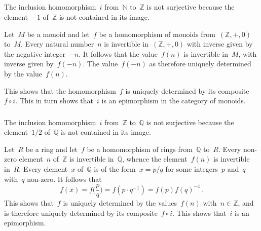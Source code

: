 \subsection{}



\subsubsection{}

The inclusion homomorphism~$i$ from~$ℕ$ to~$ℤ$ is not surjective because the element~$-1$ of~$ℤ$ is not contained in its image.

Let~$M$ be a monoid and let~$f$ be a homomorphism of monoids from~$(ℤ, +, 0)$ to~$M$.
Every natural number~$n$ is invertible in~$(ℤ, +, 0)$ with inverse given by the negative integer~$-n$.
It follows that the value~$f(n)$ is invertible in~$M$, with inverse given by~$f(-n)$.
The value~$f(-n)$ as therefore uniquely determined by the value~$f(n)$.

This shows that the homomorphism~$f$ is uniquely determined by its composite~$f ∘ i$.
This in turn shows that~$i$ is an epimorphism in the category of monoids.



\subsubsection{}

The inclusion homomorphism~$i$ from~$ℤ$ to~$ℚ$ is not surjective because the element~$1 / 2$ of~$ℚ$ is not contained in its image.

Let~$R$ be a ring and let~$f$ be a homomorphism of rings from~$ℚ$ to~$R$.
Every non-zero element~$n$ of~$ℤ$ is invertible in~$ℚ$, whence the element~$f(n)$ is invertible in~$R$.
Every element~$x$ of~$ℚ$ is of the form~$x = p / q$ for some integers~$p$ and~$q$ with~$q$ non-zero.
It follows that
\[
	f(x)
	=
	f\biggl( \frac{p}{q} \biggr)
	=
	f( p ⋅ q^{-1} )
	=
	f(p) f(q)^{-1} \,.
\]
This shows that~$f$ is uniquely determined by the values~$f(n)$ with~$n ∈ ℤ$, and is therefore uniquely determined by its composite~$f ∘ i$.
This shows that~$i$ is an epimorphism.
